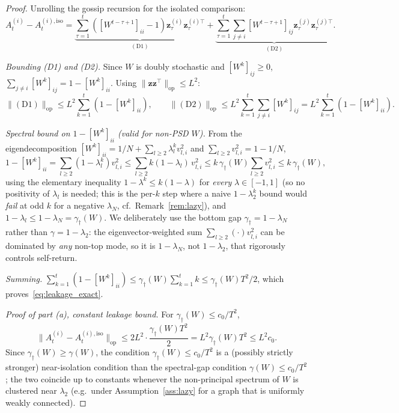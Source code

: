 \documentclass[11pt]{article}
\begin{document}
\begin{proof}
Unrolling the gossip recursion for the isolated comparison:
\[
A_t^{(i)}-A_t^{(i),\mathrm{iso}}
=\underbrace{\sum_{\tau=1}^t([W^{t-\tau+1}]_{ii}-1)
\bm{z}_\tau^{(i)}\bm{z}_\tau^{(i)\top}}_{\mathrm{(D1)}}
+\underbrace{\sum_{\tau=1}^t\sum_{j\neq i}[W^{t-\tau+1}]_{ij}
\bm{z}_\tau^{(j)}\bm{z}_\tau^{(j)\top}}_{\mathrm{(D2)}}.
\]

\textit{Bounding (D1) and (D2).}
Since $W$ is doubly stochastic and $[W^k]_{ij}\geq 0$,
$\sum_{j\neq i}[W^k]_{ij}=1-[W^k]_{ii}$.
Using $\|\bm{z}\bm{z}^\top\|_{\mathrm{op}}\leq L^2$:
\[
\|\mathrm{(D1)}\|_{\mathrm{op}}\leq L^2\sum_{k=1}^t(1-[W^k]_{ii}),
\qquad
\|\mathrm{(D2)}\|_{\mathrm{op}}\leq L^2\sum_{k=1}^t\sum_{j\neq i}[W^k]_{ij}
=L^2\sum_{k=1}^t(1-[W^k]_{ii}).
\]

\textit{Spectral bound on $1-[W^k]_{ii}$ (valid for non-PSD $W$).}
From the eigendecomposition $[W^k]_{ii}=1/N+\sum_{l\geq 2}\lambda_l^k v_{l,i}^2$
and $\sum_{l\geq 2}v_{l,i}^2=1-1/N$,
\[
1-[W^k]_{ii}=\sum_{l\geq 2}(1-\lambda_l^k)v_{l,i}^2
\leq\sum_{l\geq 2}k(1-\lambda_l)\,v_{l,i}^2
\leq k\,\gamma_\dagger(W)\sum_{l\geq 2}v_{l,i}^2
\leq k\,\gamma_\dagger(W),
\]
using the elementary inequality $1-\lambda^k\leq k(1-\lambda)$ for
\emph{every} $\lambda\in[-1,1]$ (so no positivity of $\lambda_l$ is
needed; this is the per-$k$ step where a naive $1-\lambda_2^k$ bound
would \emph{fail} at odd $k$ for a negative $\lambda_N$, cf.\
Remark~\ref{rem:lazy}), and $1-\lambda_l\leq 1-\lambda_N=\gamma_\dagger(W)$.
We deliberately use the bottom gap $\gamma_\dagger=1-\lambda_N$ rather
than $\gamma=1-\lambda_2$: the eigenvector-weighted sum
$\sum_{l\geq2}(\cdot)v_{l,i}^2$ can be dominated by \emph{any} non-top
mode, so it is $1-\lambda_N$, not $1-\lambda_2$, that rigorously
controls self-return.

\textit{Summing.}
$\sum_{k=1}^t(1-[W^k]_{ii})\leq\gamma_\dagger(W)\sum_{k=1}^t k
\leq\gamma_\dagger(W)T^2/2$, which proves~\eqref{eq:leakage_exact}.

\textit{Proof of part (a), constant leakage bound.}
For $\gamma_\dagger(W)\leq c_0/T^2$,
\[
\|A_t^{(i)}-A_t^{(i),\mathrm{iso}}\|_{\mathrm{op}}
\leq 2L^2\cdot\frac{\gamma_\dagger(W)T^2}{2}=L^2\gamma_\dagger(W)T^2\leq L^2 c_0.
\]
Since $\gamma_\dagger(W)\geq\gamma(W)$, the condition
$\gamma_\dagger(W)\leq c_0/T^2$ is a (possibly strictly stronger)
near-isolation condition than the spectral-gap condition
$\gamma(W)\leq c_0/T^2$; the two coincide up to constants whenever the
non-principal spectrum of $W$ is clustered near $\lambda_2$ (e.g.\ under
Assumption~\ref{ass:lazy} for a graph that is uniformly weakly
connected).
\end{proof}
\end{document}
